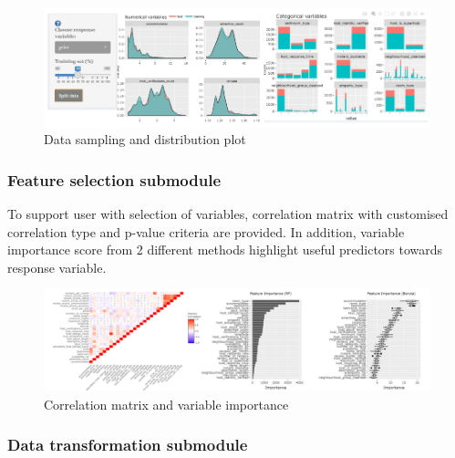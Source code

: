 \documentclass{acm_proc_article-sp}
\begin{document}
\begin{figure}[H]

{\centering \includegraphics[width=1\linewidth]{images/datasplit} 

}

\caption{Data sampling and distribution plot}\label{fig:unnamed-chunk-9}
\end{figure}

\hypertarget{feature-selection-submodule}{%
\subsubsection{Feature selection
submodule}\label{feature-selection-submodule}}

To support user with selection of variables, correlation matrix with
customised correlation type and p-value criteria are provided. In
addition, variable importance score from 2 different methods highlight
useful predictors towards response variable.

\begin{figure}[H]

{\centering \includegraphics[width=1\linewidth]{images/featselect} 

}

\caption{Correlation matrix and variable importance}\label{fig:unnamed-chunk-10}
\end{figure}

\hypertarget{data-transformation-submodule}{%
\subsubsection{Data transformation
submodule}\label{data-transformation-submodule}}
\end{document}
